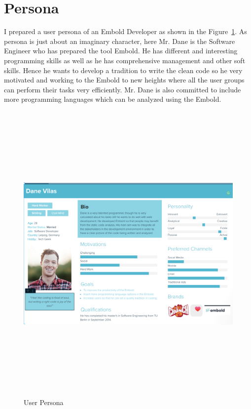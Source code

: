 \section{Persona}
I prepared a user persona of an Embold Developer as shown in the Figure~\ref{fig:User Persona}. As persona is just about an imaginary character, here Mr. Dane is the Software Engineer who has prepared the tool Embold. He has different and interesting programming skills as well as he has  comprehensive management and other soft skills. Hence he wants to develop a tradition to write the clean code so he very motivated and working to the Embold to new heights where all the user groups can perform their tasks very efficiently. Mr. Dane is also committed to   include more programming languages which can be analyzed using the Embold.
\begin{figure}[htbp]
\begin{center}
\includegraphics[width=6.5in, height=6in]{persona.png}
\caption{User Persona}
\label{fig:User Persona}
\end{center}
\end{figure}